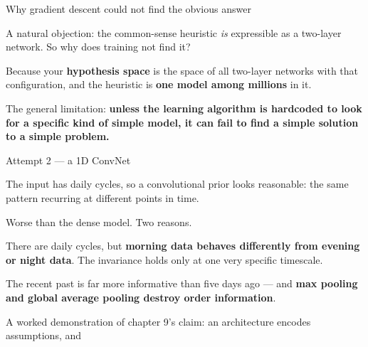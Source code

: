 \documentclass[aspectratio=169,11pt,t]{beamer}
\begin{document}
\begin{frame}[shrink=25]{Why gradient descent could not find the obvious answer}
{\fontsize{9.4}{12.6}\selectfont\color{fg2}A natural objection: the common-sense heuristic \textit{is} expressible as a two-layer network. So why does training not find it?\par}\vskip 4pt
\begin{iband}[signal]
Because your \textbf{hypothesis space} is the space of all two-layer networks with that configuration, and the heuristic is \textbf{one model among millions} in it. 
\end{iband}
{\fontsize{9.4}{12.6}\selectfont\color{fg2}The general limitation: \textbf{unless the learning algorithm is hardcoded to look for a specific kind of simple model, it can fail to find a simple solution to a simple problem.}\par}\vskip 4pt
\end{frame}

\begin{frame}[shrink=25]{Attempt 2 --- a 1D ConvNet}
{\fontsize{9.4}{12.6}\selectfont\color{fg2}The input has daily cycles, so a convolutional prior looks reasonable: the same pattern recurring at different points in time.\par}\vskip 4pt
\end{frame}

\begin{frame}[shrink=25]{Worse than the dense model. Two reasons.}
\begin{minipage}[t]{0.494\textwidth}
\begin{icardbad}
There are daily cycles, but \textbf{morning data behaves differently from evening or night data}. The invariance holds only at one very specific timescale.
\end{icardbad}
\end{minipage}%
\hfill
\begin{minipage}[t]{0.494\textwidth}
\begin{icardbad}
The recent past is far more informative than five days ago --- and \textbf{max pooling and global average pooling destroy order information}.
\end{icardbad}
\end{minipage}%
\begin{iband}[signal]
A worked demonstration of chapter 9's claim: an architecture encodes assumptions, and 
\end{iband}
\end{frame}
\end{document}
